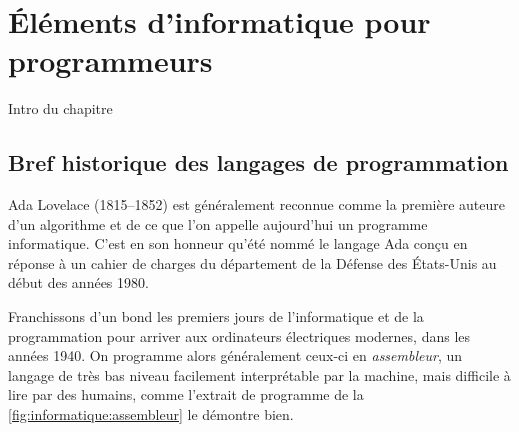
\chapter{Éléments d'informatique pour programmeurs}
\label{chap:informatique}

Intro du chapitre

\section{Bref historique des langages de programmation}
\label{sec:informatique:historique}

Ada Lovelace (1815--1852) est généralement reconnue comme la première
auteure d'un algorithme et de ce que l'on appelle aujourd'hui un
programme informatique. C'est en son honneur qu'été nommé le langage
Ada conçu en réponse à un cahier de charges du département de la
Défense des États-Unis au début des années 1980.

Franchissons d'un bond les premiers jours de l'informatique et de la
programmation pour arriver aux ordinateurs électriques modernes, dans
les années 1940. On programme alors généralement ceux-ci en
\emph{assembleur}, un langage de très bas niveau facilement
interprétable par la machine, mais difficile à lire par des humains,
comme l'extrait de programme de la
\autoref{fig:informatique:assembleur} le démontre bien.

